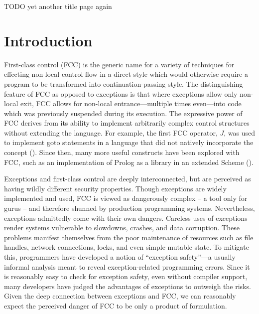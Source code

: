 \documentclass[11pt]{article}
\begin{document}
\newpage
TODO yet another title page again

\newpage
\tableofcontents

\newpage
\listoffigures

\newpage{}
\section{Introduction}

First-class control (FCC) is the generic name for a variety of techniques for effecting non-local control flow in a direct style which would otherwise require a program to be transformed into continuation-passing style.
The distinguishing feature of FCC as opposed to exceptions is that where exceptions allow only non-local exit, FCC allows for non-local entrance---multiple times even---into code which was previously suspended during its execution.
The expressive power of FCC derives from its ability to implement arbitrarily complex control structures without extending the language.
For example, the first FCC operator, $J$, was used to implement goto statements in a language that did not natively incorporate the concept (\cite{ISWIM}).
Since then, many more useful constructs have been explored with FCC, such as an implementation of Prolog as a library in an extended Scheme (\cite{HandlingControl}).


Exceptions and first-class control are deeply interconnected, but are perceived as having wildly different security properties.
Though exceptions are widely implemented and used, FCC is viewed as dangerously complex -- a tool only for gurus -- and therefore shunned by production programming systems.
Nevertheless, exceptions admittedly come with their own dangers.
Careless uses of exceptions render systems vulnerable to slowdowns, crashes, and data corruption.
These problems manifest themselves from the poor maintenance of resources such as file handles, network connections, locks, and even simple mutable state.
To mitigate this, programmers have developed a notion of ``exception safety''---a usually informal analysis meant to reveal exception-related programming errors.
Since it is reasonably easy to check for exception safety, even without compiler support, many developers have judged the advantages of exceptions to outweigh the risks.
Given the deep connection between exceptions and FCC, we can reasonably expect the perceived danger of FCC to be only a product of formulation.
\end{document}
